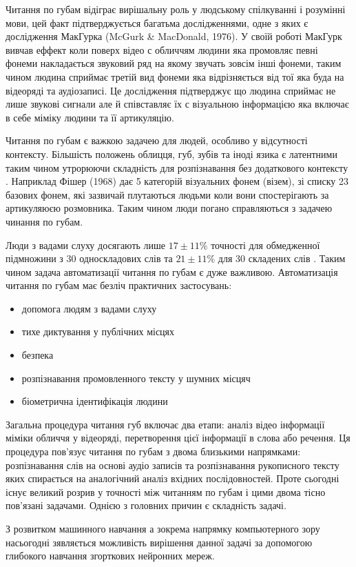 \intro
\pagestyle{plain}

Читання по губам відіграє вирішальну роль у людському спілкуванні і розумінні мови, цей факт 
підтверджується багатьма дослідженнями, одне з яких є дослідження МакГурка (McGurk \& MacDonald, 1976). 
У своїй роботі МакГурк вивчав еффект коли поверх відео с обличчям людини яка промовляє певні фонеми 
накладається звуковий ряд на якому звучать зовсім інші фонеми, таким чином людина сприймає третій вид 
фонеми яка відрізняється від тої яка буда на відеоряді та аудіозаписі. Це дослідження підтверджує що 
людина сприймає не лише звукові сигнали але й співставляє їх с візуальною інформацією яка включає в 
себе міміку людини та її артикуляцію.

Читання по губам є важкою задачею для людей, особливо у відсутності контексту. Більшість положень облицця, 
губ, зубів та іноді язика є латентними таким чином утрорюючи складність для розпізнавання без додаткового 
контексту \cite{doi:10.1044/jshr.1104.796}. Наприклад Фішер (1968) дає 5 категорій візуальних фонем (візем), зі 
списку 23 базових фонем, які зазвичай плутаються людьми коли вони спостерігають за артикуляюєю розмовника. 
Таким чином люди погано справляються з задачею чинання по губам. 

Люди з вадами слуху досягають лише $17 \pm 11\%$ точності для обмедженної підмножини з $30$ односкладових слів 
та $21 \pm 11\%$ для 30 складених слів \cite{easton1982perceptual}. Таким чином задача автоматизації читання по 
губам є дуже важливою. Автоматизація читання по губам має безліч практичних застосувань:

\begin{itemize}
    \item допомога людям з вадами слуху
    \item тихе диктування у публічних місцях
    \item безпека
    \item розпізнавання промовленного тексту у шумних місцяч
    \item біометрична ідентифікація людини
\end{itemize}

Загальна процедура читання губ включає два етапи: аналіз відео інформації міміки обличчя у відеоряді, 
перетворення цієї інформації в слова або речення. Ця процедура пов'язує читання по губам з двома близькими 
напрямками: розпізнавання слів на основі аудіо записів та розпізнавання рукописного тексту яких 
спирається на аналогічний аналіз вхідних послідовностей. Проте сьогодні існує великий розрив у 
точності між читанням по губам і цими двома тісно пов'язані задачами. Однією з головних причин 
є  складність задачі.

З розвитком машинного навчання а зокрема напрямку компьютерного зору насьогодні зявляється можливість 
вирішення данної задачі за допомогою глибокого навчання згорткових нейронних мереж. 